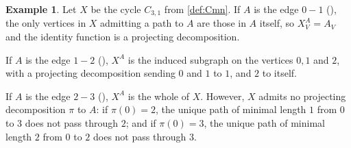 \documentclass[11pt]{article}
\theoremstyle{definition}
\newtheorem{example}[theo]{Example}
\numberwithin{equation}{section}
\begin{document}
\begin{example}\label{ex:proj-decomp}
Let $X$ be the cycle $C_{3,1}$ from \cref{def:Cmn}.
If $A$ is the edge $0-1$ (), the only vertices in $X$ admitting a path to $A$ are those in $A$ itself, so $X_{V}^A = A_V$ and the identity function is a projecting decomposition.

If $A$ is the edge $1-2$ (), $X^A$ is the induced subgraph on the vertices $0,1$ and $2$, with a projecting decomposition sending $0$ and $1$ to $1$, and $2$ to itself.

If $A$ is the edge $2-3$ (), $X^A$ is the whole of $X$. However, $X$ admits no projecting decomposition $\pi$ to $A$: if $\pi(0) = 2$, the unique path of minimal length $1$ from $0$ to $3$ does not pass through $2$; and if $\pi(0) = 3$, the unique path of minimal length $2$ from $0$ to $2$ does not pass through $3$.

    \begin{figure}[H]
        \centering
        \begin{subfigure}[c]{0.3\textwidth}
            \centering
            \caption{}
            \label{C31-01}
        \end{subfigure}
        \begin{subfigure}[c]{0.3\textwidth}
            \centering
\end{subfigure}
\end{figure}
\end{example}
\end{document}
